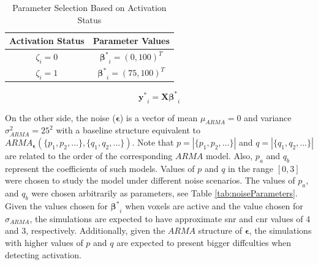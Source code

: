 \begin{table}[htbp!]
\centering
\caption{Parameter Selection Based on Activation Status}
\begin{tabular}{cc}
\hline
\textbf{Activation Status} & \textbf{Parameter Values} \\ \hline
$\zeta_i=0$ & $\bm{\beta^*}_i = (0,100)^T$ \\
$\zeta_i=1$ & $\bm{\beta^*}_i = (75,100)^T$ \\ \hline
\end{tabular}
\label{tab:betaParameter}
\end{table}

\begin{equation} \label{eq:boldCleanCalc}
\bm{y^*}_i = \bm{X}\bm{\beta^*}_i
\end{equation}

On the other side, the noise ($\bm{\epsilon}$) is a vector of mean $\mu_{ARMA} = 0$ and 
variance $\sigma_{ARMA}^2=25^2$ with a baseline structure equivalent to 
${ARMA}_{\bm{\epsilon}}\left( \{p_1,p_2,\dots\},\{q_1,q_2,\dots\} \right)$. 
Note that $p = \left| \{p_1,p_2,\dots\} \right|$ and $q= \left| \{q_1,q_2,\dots\} \right|$ 
are related to the order of the corresponding $ARMA$ model. Also, $p_a$ and $q_b$ represent 
the coefficients of such models. Values of $p$ and $q$ in the range $[0,3]$ were chosen to 
study the model under different noise scenarios. The values of $p_a$, 
and $q_b$ were chosen arbitrarily as parameters, see Table \ref{tab:noiseParameters}. Given the
values chosen for $\bm{\beta^*}_i$ when voxels are active and the value chosen for $\sigma_{ARMA}$,
the simulations are expected to have approximate \gls{snr} and \gls{cnr} values of 4 and 3, respectively.
Additionally, given the $ARMA$ structure of $\bm{\epsilon}$, the simulations with higher values of $p$ and
$q$ are expected to present bigger diffculties when detecting activation.

